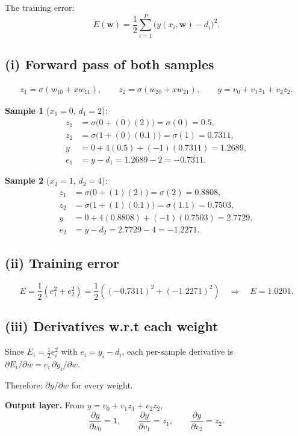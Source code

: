 \documentclass[11pt,letterpaper]{article}
\newcommand{\sig}{\sigma}
\newcommand{\pd}[2]{\frac{\partial #1}{\partial #2}}
\begin{document}
The training error:
\[
E(\mathbf w)=\frac12\sum_{i=1}^{P}\bigl(y(x_i,\mathbf w)-d_i\bigr)^2 .
\]

\subsection*{(i) Forward pass of both samples}
\begin{gather*}
z_1=\sig(w_{10}+xw_{11}),\qquad z_2=\sig(w_{20}+xw_{21}),\qquad
y=v_0+v_1z_1+v_2z_2 .
\end{gather*}

\textbf{Sample 1} ($x_1=0$, $d_1=2$):
\begin{align*}
z_1&=\sig\bigl(0+(0)(2)\bigr)=\sig(0)=0.5,\\
z_2&=\sig\bigl(1+(0)(0.1)\bigr)=\sig(1)=0.7311,\\
y&=0+4(0.5)+(-1)(0.7311)=1.2689,\\
e_1&=y-d_1=1.2689-2=-0.7311.
\end{align*}

\textbf{Sample 2} ($x_2=1$, $d_2=4$):
\begin{align*}
z_1&=\sig\bigl(0+(1)(2)\bigr)=\sig(2)=0.8808,\\
z_2&=\sig\bigl(1+(1)(0.1)\bigr)=\sig(1.1)=0.7503,\\
y&=0+4(0.8808)+(-1)(0.7503)=2.7729,\\
e_2&=y-d_2=2.7729-4=-1.2271.
\end{align*}

\subsection*{(ii) Training error}

\[
E=\frac12\left(e_1^2+e_2^2\right)
=\frac12\left((-0.7311)^2+(-1.2271)^2\right)
\quad\Longrightarrow\quad \boxed{E=1.0201}.
\]

\subsection*{(iii) Derivatives w.r.t each weight}

Since $E_i=\tfrac12e_i^2$ with $e_i=y_i-d_i$, each per-sample derivative is
$\partial E_i/\partial w=e_i\,\partial y_i/\partial w$.

Therefore:
$\partial y/\partial w$ for every weight.

\textbf{Output layer.} From $y=v_0+v_1z_1+v_2z_2$,
\[
\pd{y}{v_0}=1,\qquad \pd{y}{v_1}=z_1,\qquad \pd{y}{v_2}=z_2 .
\]
\end{document}
